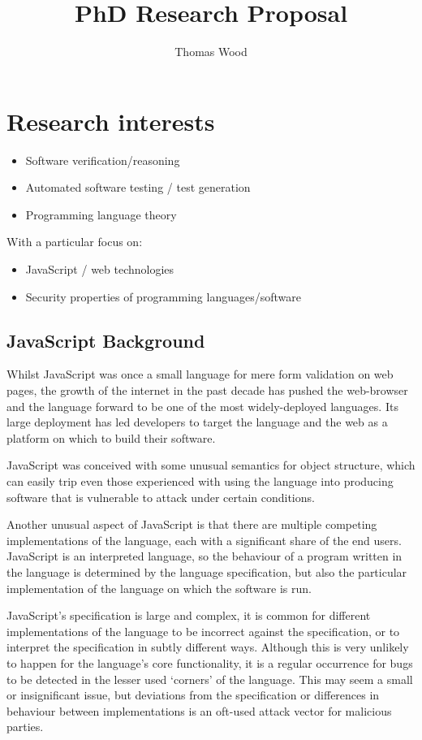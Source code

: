 \documentclass[a4paper]{article}
\title{PhD Research Proposal}
\author{Thomas Wood}
\begin{document}
\maketitle

\section{Research interests}
\begin{itemize}
\item Software verification/reasoning
\item Automated software testing / test generation
\item Programming language theory
\end{itemize}
With a particular focus on:
\begin{itemize}
\item JavaScript / web technologies
\item Security properties of programming languages/software
\end{itemize}

\subsection{JavaScript Background}
Whilst JavaScript was once a small language for mere form validation on web
pages, the growth of the internet in the past decade has pushed the web-browser
and the language forward to be one of the most widely-deployed languages.
Its large deployment has led developers to target the language and the web as a
platform on which to build their software. %

JavaScript was conceived with some unusual semantics for object structure, which
can easily trip even those experienced with
using the language into producing software that is vulnerable to attack under
certain conditions.

Another unusual aspect of JavaScript is that there are multiple competing
implementations of the language, each with a significant share of the end users.
JavaScript is an interpreted language, so the behaviour of a program written in
the language is determined by the language specification, but also
the particular implementation of the language on which the software is
run.

JavaScript's specification is large and complex, it is common for
different implementations of the language to be incorrect against the
specification, or to interpret the specification in subtly different ways.
Although this is very unlikely to happen for the language's core functionality,
it is a regular occurrence for bugs to be detected in the lesser used `corners'
of the language. This may seem a small or insignificant issue, but
deviations from the specification or differences in behaviour between
implementations is an oft-used attack vector for malicious parties.
\end{document}
